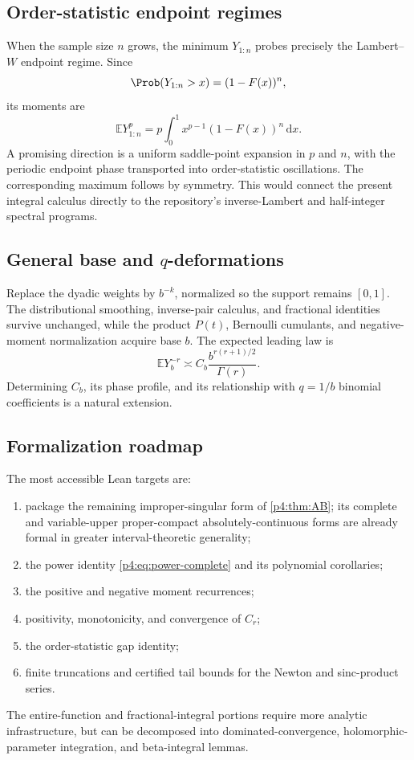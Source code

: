 \documentclass[11pt,oneside]{article}
\theoremstyle{definition}
\theoremstyle{remark}
\newcommand{\F}{F}
\newcommand{\E}{\mathbb E}
\newcommand{\dd}{\,\mathrm d}
\newcommand{\1}{\mathbf 1}
\begin{document}
\subsection{Order-statistic endpoint regimes}

When the sample size \(n\) grows, the minimum \(Y_{1:n}\) probes precisely the
Lambert--\(W\) endpoint regime.  Since
\[
 \Prob(Y_{1:n}>x)=(1-\F(x))^n,
\]
its moments are
\begin{equation}\label{p4:eq:min-order-moment}
 \E Y_{1:n}^p=p\int_0^1x^{p-1}(1-\F(x))^n\dd x.
\end{equation}
A promising direction is a uniform saddle-point expansion in \(p\) and \(n\), with the
periodic endpoint phase transported into order-statistic oscillations.  The corresponding
maximum follows by symmetry.  This would connect the present integral calculus directly
to the repository's inverse-Lambert and half-integer spectral programs.

\subsection{General base and \texorpdfstring{\(q\)}{q}-deformations}

Replace the dyadic weights by \(b^{-k}\), normalized so the support remains \([0,1]\).
The distributional smoothing, inverse-pair calculus, and fractional identities survive
unchanged, while the product \(P(t)\), Bernoulli cumulants, and negative-moment
normalization acquire base \(b\).  The expected leading law is
\begin{equation}\label{p4:eq:baseb-heuristic}
 \E Y_b^{-r}
 \asymp C_b\frac{b^{r(r+1)/2}}{\Gamma(r)}.
\end{equation}
Determining \(C_b\), its phase profile, and its relationship with \(q=1/b\) binomial
coefficients is a natural extension.

\subsection{Formalization roadmap}

The most accessible Lean targets are:
\begin{enumerate}
\item package the remaining improper-singular form of \cref{p4:thm:AB}; its complete and
      variable-upper proper-compact absolutely-continuous forms are already formal in
      greater interval-theoretic generality;
\item the power identity \cref{p4:eq:power-complete} and its polynomial corollaries;
\item the positive and negative moment recurrences;
\item positivity, monotonicity, and convergence of \(C_r\);
\item the order-statistic gap identity;
\item finite truncations and certified tail bounds for the Newton and sinc-product
series.
\end{enumerate}
The entire-function and fractional-integral portions require more analytic infrastructure,
but can be decomposed into dominated-convergence, holomorphic-parameter integration,
and beta-integral lemmas.
\end{document}
